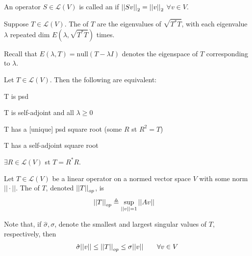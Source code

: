 \documentclass[11pt]{article}
\begin{document}
\begin{definition}[-1em][Isometry]
	An operator $S \in \mathcal L(V)$ is called an  if $\norm{Sv} = \norm{v}$ $\forall v \in V$. 
\end{definition}

\begin{definition}
	Suppose $T \in \mathcal L(V)$. The  of $T$ are the eigenvalues of $\sqrt{T^* T}$, with each eigenvalue $\lambda$ repeated dim $E(\lambda, \sqrt{T^* T})$ times. 
	
	Recall that $E(\lambda, T) = \text{null}(T - \lambda I)$ denotes the eigenspace of $T$ corresponding to $\lambda$. 
\end{definition}

\begin{definition}
	Let $T \in \mathcal L(V)$. Then the following are equivalent:
	\begin{compactitem}
		\item T is psd
		\item T is self-adjoint and all $\lambda \geq 0$
		\item T has a [unique] psd square root (some $R$ st $R^2 = T$)
		\item T has a self-adjoint square root
		\item $\exists R \in \mathcal L(V)$ st $T = R^*R$. 
	\end{compactitem}
\end{definition}


\begin{definition}
	Let $T \in \mathcal L(V)$ be a linear operator on a normed vector space $V$ with some norm $|| \cdot ||$. The  of $T$, denoted $\norm[op]{T}$, is
	\begin{align}
		\norm[op]{T}
		&\triangleq \sup_{||v|| = 1} ||Av||
	\end{align}
	
	Note that, if $\hat \sigma, \sigma$, denote the smallest and largest singular values of $T$, respectively, then
	\begin{align}
		\hat \sigma ||v || \leq \norm[op]{T} \leq \sigma || v|| \qquad \forall v \in V
	\end{align}
\end{definition}
\end{document}
